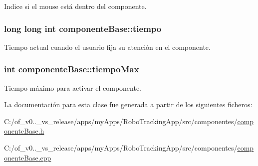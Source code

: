 Indice si el mouse está dentro del componente. 

\hypertarget{classcomponente_base_a6c1aa628629954f831209628e3dfcb2b}{}
\subsubsection[{tiempo}]{\setlength{\rightskip}{0pt plus 5cm}long long int componente\+Base\+::tiempo\hspace{0.3cm}{\ttfamily [protected]}}\label{classcomponente_base_a6c1aa628629954f831209628e3dfcb2b}


Tiempo actual cuando el usuario fija su atención en el componente. 

\hypertarget{classcomponente_base_a0edb9230fa502947fd80006463f9ce25}{}
\subsubsection[{tiempo\+Max}]{\setlength{\rightskip}{0pt plus 5cm}int componente\+Base\+::tiempo\+Max\hspace{0.3cm}{\ttfamily [protected]}}\label{classcomponente_base_a0edb9230fa502947fd80006463f9ce25}


Tiempo máximo para activar el componente. 



La documentación para esta clase fue generada a partir de los siguientes ficheros\+:\begin{DoxyCompactItemize}
\item 
C\+:/of\+\_\+v0..\+\_\+vs\+\_\+release/apps/my\+Apps/\+Robo\+Tracking\+App/src/componentes/\hyperlink{componente_base_8h}{componente\+Base.\+h}\item 
C\+:/of\+\_\+v0..\+\_\+vs\+\_\+release/apps/my\+Apps/\+Robo\+Tracking\+App/src/componentes/\hyperlink{componente_base_8cpp}{componente\+Base.\+cpp}\end{DoxyCompactItemize}
